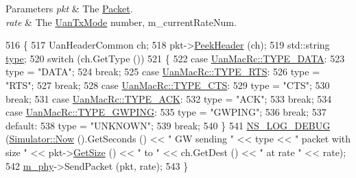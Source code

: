 \begin{DoxyParams}{Parameters}
{\em pkt} & The \hyperlink{classns3_1_1Packet}{Packet}. \\
\hline
{\em rate} & The \hyperlink{classns3_1_1UanTxMode}{Uan\+Tx\+Mode} number, m\+\_\+current\+Rate\+Num. \\
\hline
\end{DoxyParams}

\begin{DoxyCode}
516 \{
517   UanHeaderCommon ch;
518   pkt->\hyperlink{classns3_1_1Packet_aadc63487bea70945c418f4c3e9b81964}{PeekHeader} (ch);
519   std::string \hyperlink{visualizer-ideas_8txt_add98db9e15e2a58cf2b57623e7aa893a}{type};
520   \textcolor{keywordflow}{switch} (ch.GetType ())
521     \{
522     \textcolor{keywordflow}{case} \hyperlink{classns3_1_1UanMacRc_ad12bbd636f03943095e1c81cd1cc24b3a21bca93e0670db9a343de5d95ff64092}{UanMacRc::TYPE\_DATA}:
523       type = \textcolor{stringliteral}{"DATA"};
524       \textcolor{keywordflow}{break};
525     \textcolor{keywordflow}{case} \hyperlink{classns3_1_1UanMacRc_ad12bbd636f03943095e1c81cd1cc24b3a04488fc6d8b08804abbb178e0af7a6dc}{UanMacRc::TYPE\_RTS}:
526       type = \textcolor{stringliteral}{"RTS"};
527       \textcolor{keywordflow}{break};
528     \textcolor{keywordflow}{case} \hyperlink{classns3_1_1UanMacRc_ad12bbd636f03943095e1c81cd1cc24b3a6c74a18f3ef5f623c1301ed43d64eaa6}{UanMacRc::TYPE\_CTS}:
529       type = \textcolor{stringliteral}{"CTS"};
530       \textcolor{keywordflow}{break};
531     \textcolor{keywordflow}{case} \hyperlink{classns3_1_1UanMacRc_ad12bbd636f03943095e1c81cd1cc24b3a39266e2ea841589d68abb33f3691d9b3}{UanMacRc::TYPE\_ACK}:
532       type = \textcolor{stringliteral}{"ACK"};
533       \textcolor{keywordflow}{break};
534     \textcolor{keywordflow}{case} \hyperlink{classns3_1_1UanMacRc_ad12bbd636f03943095e1c81cd1cc24b3a704bedfcbfafb80b9a7d280385e60e8b}{UanMacRc::TYPE\_GWPING}:
535       type = \textcolor{stringliteral}{"GWPING"};
536       \textcolor{keywordflow}{break};
537     \textcolor{keywordflow}{default}:
538       type = \textcolor{stringliteral}{"UNKNOWN"};
539       \textcolor{keywordflow}{break};
540     \}
541   \hyperlink{group__logging_ga413f1886406d49f59a6a0a89b77b4d0a}{NS\_LOG\_DEBUG} (\hyperlink{classns3_1_1Simulator_ac3178fa975b419f7875e7105be122800}{Simulator::Now} ().GetSeconds () << \textcolor{stringliteral}{" GW sending "} << type << \textcolor{stringliteral}{"
       packet with size "} << pkt->\hyperlink{classns3_1_1Packet_a462855c9929954d4301a4edfe55f4f1c}{GetSize} () << \textcolor{stringliteral}{" to "} << ch.GetDest () << \textcolor{stringliteral}{" at rate "} << rate);
542   \hyperlink{classns3_1_1UanMacRcGw_a68b75b833bd901fb5b26b4ee92205866}{m\_phy}->SendPacket (pkt, rate);
543 \}
\end{DoxyCode}



